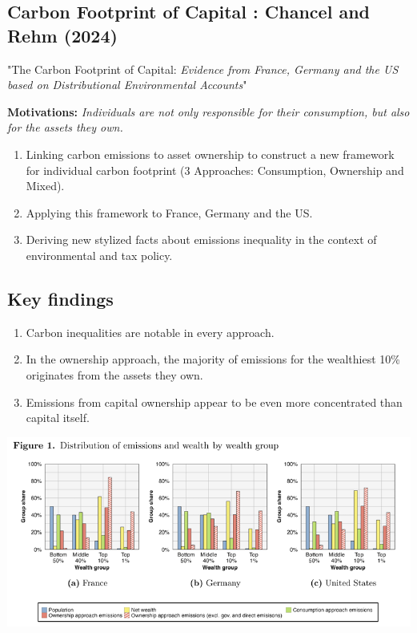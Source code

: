 \documentclass[10pt]{beamer}
\begin{document}
\subsection{Carbon Footprint of Capital : Chancel and Rehm (2024)}
\begin{frame}{\subsecname}
    \begin{center}
    "The Carbon Footprint of Capital: 
    \textit{Evidence from France, Germany and the US based on Distributional Environmental Accounts}"
    \end{center}

    \textbf{Motivations:}
    \textit{Individuals are not only responsible for their consumption, but also for the assets they own.}
    \begin{enumerate}
        \item Linking carbon emissions to asset ownership to construct a new framework for individual carbon footprint (3 Approaches: Consumption, Ownership and Mixed).
        \item Applying this framework to France, Germany and the US.
        \item Deriving new stylized facts about emissions inequality in the context of environmental and tax policy.
    \end{enumerate}
\end{frame}

\subsection{Key findings}
\begin{frame}{\subsecname}
    \begin{enumerate}
        \item Carbon inequalities are notable in every approach.
        \item In the ownership approach, the majority of emissions for the wealthiest 10\% originates from the assets they own.
        \item Emissions from capital ownership appear to be even more concentrated than capital itself.
    \end{enumerate}
    \includegraphics[width=1\linewidth]{../Figures/F1.png}
\end{frame}
\end{document}
